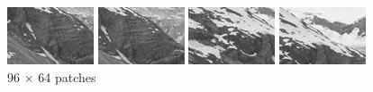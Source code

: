 \documentclass{article}
\begin{document}
\begin{figure}[H]
	\begin{minipage}[b]{0.24\linewidth}
		\centering
		\includegraphics[width=72pt]{../result/patch-96-64-4.png}
	\end{minipage}
	\begin{minipage}[b]{0.24\linewidth}
		\centering
		\includegraphics[width=72pt]{../result/patch-96-64-5.png}
	\end{minipage}
	\begin{minipage}[b]{0.24\linewidth}
		\centering
		\includegraphics[width=72pt]{../result/patch-96-64-6.png}
	\end{minipage}
	\begin{minipage}[b]{0.24\linewidth}
		\centering
		\includegraphics[width=72pt]{../result/patch-96-64-7.png}
	\end{minipage}
	\caption{96 $\times$ 64 patches}
\end{figure}
\end{document}
